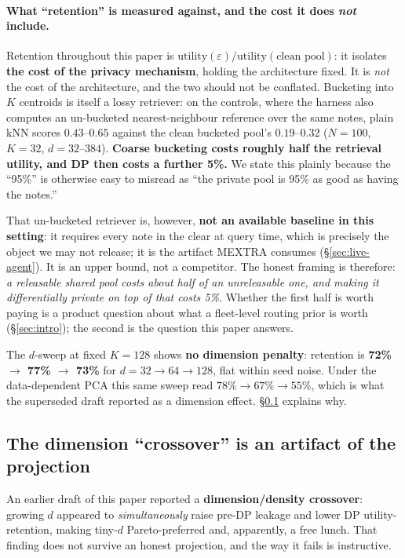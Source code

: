 \documentclass[pdflatex,sn-mathphys-num,iicol]{sn-jnl}
\theoremstyle{thmstyleone}%
\theoremstyle{thmstyletwo}%
\theoremstyle{thmstylethree}%
\newcommand{\eps}{\varepsilon}
\newcommand{\secref}[1]{\S\ref{#1}}
\begin{document}
\paragraph{What ``retention'' is measured against, and the cost it does \emph{not} include.}
Retention throughout this paper is $\mathrm{utility}(\eps) / \mathrm{utility}(\text{clean
pool})$: it isolates \textbf{the cost of the privacy mechanism}, holding the architecture
fixed. It is \emph{not} the cost of the architecture, and the two should not be conflated.
Bucketing into $K$ centroids is itself a lossy retriever: on the controls, where the harness
also computes an un-bucketed nearest-neighbour reference over the same notes, plain kNN scores
$0.43$--$0.65$ against the clean bucketed pool's $0.19$--$0.32$ ($N = 100$, $K = 32$,
$d = 32$--$384$). \textbf{Coarse bucketing costs roughly half the retrieval utility, and DP then
costs a further 5\%.} We state this plainly because the ``95\%'' is otherwise easy to misread as
``the private pool is 95\% as good as having the notes.''

That un-bucketed retriever is, however, \textbf{not an available baseline in this setting}: it
requires every note in the clear at query time, which is precisely the object we may not
release; it is the artifact MEXTRA consumes (\secref{sec:live-agent}). It is an upper bound,
not a competitor. The honest framing is therefore: \emph{a releasable shared pool costs about
half of an unreleasable one, and making it differentially private on top of that costs 5\%.}
Whether the first half is worth paying is a product question about what a fleet-level routing
prior is worth (\secref{sec:intro}); the second is the question this paper answers.

The $d$-sweep at fixed $K = 128$ shows \textbf{no dimension penalty}: retention is
\textbf{72\% $\to$ 77\% $\to$ 73\%} for $d = 32 \to 64 \to 128$, flat within seed noise.
Under the data-dependent PCA this same sweep read $78\% \to 67\% \to 55\%$, which is what
the superseded draft reported as a dimension effect. \secref{sec:crossover} explains why.

\subsection{The dimension ``crossover'' is an artifact of the
projection}\label{sec:crossover}

An earlier draft of this paper reported a \textbf{dimension/density crossover}: growing
$d$ appeared to \emph{simultaneously} raise pre-DP leakage and lower DP
utility-retention, making tiny-$d$ Pareto-preferred and, apparently, a free lunch. That
finding does not survive an honest projection, and the way it fails is instructive.
\end{document}
